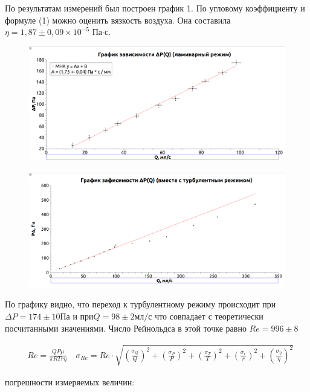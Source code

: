 \documentclass[a4paper, 12pt]{article}
\begin{document}
По результатам измерений был построен график 1. По угловому коэффициенту и формуле (1) можно оценить вязкость воздуха. Она составила $\eta = 1,87 \pm 0,09 \times 10^{-5}$ Па$\cdot$с.

\begin{figure}[H]
    \centering
    \includegraphics[scale=0.25]{chart.png}
    \label{p(q)}
\end{figure}


\begin{figure}[H]
    \centering
    \includegraphics[scale=0.25]{2.png}
    \label{p(q)}
\end{figure}

По графику видно, что переход к турбулентному режиму происходит при $\Delta P = 174 \pm 10 \text{Па и при} Q = 98 \pm 2 \text{мл/с} $ что совпадает с теоретически посчитанными значениями. Число Рейнольдса в этой точке равно $Re = 996 \pm 8$ 


\begin{align}
    &Re = \frac{Q P \mu}{\pi R T r \eta} \quad \sigma_{Re} = Re \cdot \sqrt{(\frac{\sigma_{Q}}{Q})^2 + (\frac{\sigma_{P}}{P})^2 + (\frac{\sigma_{T}}{T})^2 + (\frac{\sigma_{r}}{r})^2 + (\frac{\sigma_{\eta}}{\eta})^2}
\end{align}

погрешности измеряемых величин:
\centering
\newline
\end{document}
